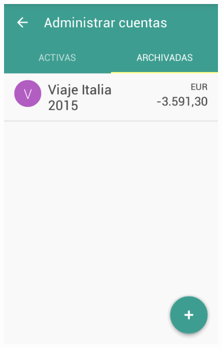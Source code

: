 \begin{figure}[ht]
\begin{minipage}{.5\textwidth}
\centering
  \includegraphics[scale=0.45,type=png,ext=.png,read=.png]{imagenes/archived_accounts}
  \captionsetup{justification=centering}
  \label{fig:interfazListarArchivedAccounts}
\end{minipage}
\end{figure}

